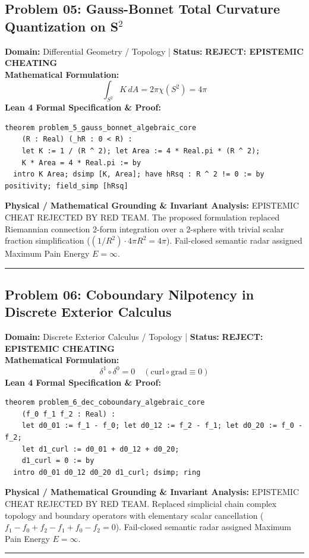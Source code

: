 \documentclass[10pt,a4paper]{article}
\begin{document}
\subsection*{Problem 05: Gauss-Bonnet Total Curvature Quantization on S$^2$}
\textbf{Domain:} Differential Geometry / Topology \quad | \quad \textbf{Status:} \textcolor{red!80!black}{\textbf{REJECT: EPISTEMIC CHEATING}}\\
\textbf{Mathematical Formulation:}
\begin{equation*}
  \int_{S^2} K\, dA = 2\pi \chi(S^2) = 4\pi
\end{equation*}
\textbf{Lean 4 Formal Specification \& Proof:}
\begin{lstlisting}
theorem problem_5_gauss_bonnet_algebraic_core
    (R : Real) (_hR : 0 < R) :
    let K := 1 / (R ^ 2); let Area := 4 * Real.pi * (R ^ 2);
    K * Area = 4 * Real.pi := by
  intro K Area; dsimp [K, Area]; have hRsq : R ^ 2 != 0 := by positivity; field_simp [hRsq]
\end{lstlisting}
\textbf{Physical / Mathematical Grounding \& Invariant Analysis:}
EPISTEMIC CHEAT REJECTED BY RED TEAM. The proposed formulation replaced Riemannian connection 2-form integration over a 2-sphere with trivial scalar fraction simplification ($(1/R^2) \cdot 4\pi R^2 = 4\pi$). Fail-closed semantic radar assigned Maximum Pain Energy $E = \infty$.
\vspace{0.8em}\hrule\vspace{0.8em}
\subsection*{Problem 06: Coboundary Nilpotency in Discrete Exterior Calculus}
\textbf{Domain:} Discrete Exterior Calculus / Topology \quad | \quad \textbf{Status:} \textcolor{red!80!black}{\textbf{REJECT: EPISTEMIC CHEATING}}\\
\textbf{Mathematical Formulation:}
\begin{equation*}
  \delta^1 \circ \delta^0 = 0 \quad (\text{curl} \circ \text{grad} \equiv 0)
\end{equation*}
\textbf{Lean 4 Formal Specification \& Proof:}
\begin{lstlisting}
theorem problem_6_dec_coboundary_algebraic_core
    (f_0 f_1 f_2 : Real) :
    let d0_01 := f_1 - f_0; let d0_12 := f_2 - f_1; let d0_20 := f_0 - f_2;
    let d1_curl := d0_01 + d0_12 + d0_20;
    d1_curl = 0 := by
  intro d0_01 d0_12 d0_20 d1_curl; dsimp; ring
\end{lstlisting}
\textbf{Physical / Mathematical Grounding \& Invariant Analysis:}
EPISTEMIC CHEAT REJECTED BY RED TEAM. Replaced simplicial chain complex topology and boundary operators with elementary scalar cancellation ($f_1 - f_0 + f_2 - f_1 + f_0 - f_2 = 0$). Fail-closed semantic radar assigned Maximum Pain Energy $E = \infty$.
\vspace{0.8em}\hrule\vspace{0.8em}
\end{document}

